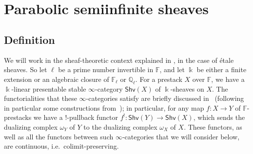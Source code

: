 \documentclass[11pt]{amsart}
\numberwithin{equation}{section}
\theoremstyle{plain}
\theoremstyle{definition}
\newcommand{\C}{{\mathbb C}}
\newcommand{\F}{{\mathbb F}}
\newcommand{\I}{{\mathrm I}}
\renewcommand{\k}{\Bbbk}
\newcommand{\Q}{{\mathbb Q}}
\newcommand{\xs}{{\ \xrightarrow{\sim}\ }}
\newcommand{\Shv}{\mathsf{Shv}}
\newcommand{\rS}{\mathfrak{S}}
\begin{document}
%

\section{Parabolic semiinfinite sheaves} 
\label{sec:quar-semi-sheaves}

\subsection{Definition} 
\label{ss:qs-sheaves}

We will work in the sheaf-theoretic context explained in \cite[\S\S 2.1--2.2]{adr}, in the case of \'etale sheaves.
So let $\ell$ be a prime number invertible in $\F$, and let $\k$ be either a finite extension or an algebraic closure of $\F_\ell$ or $\Q_\ell$.
For a prestack $X$ over $\F$, we have a $\k$-linear presentable stable $\infty$-category $\Shv(X)$ of $\k$-sheaves on $X$. The functorialities that these $\infty$-categories satisfy are briefly discussed in~\cite[\S 2.2]{adr} (following in particular some constructions from~\cite{zhu}); in particular, for any map $f : X \to Y$ of $\F$-prestacks we have a $!$-pullback functor $f^! : \Shv(Y) \to \Shv(X)$, which sends the dualizing complex $\omega_Y$ of $Y$ to the dualizing complex $\omega_X$ of $X$. These functors, as well as all the functors between such $\infty$-categories that we will consider below, are continuous, i.e.~colimit-preserving.
\end{document}
